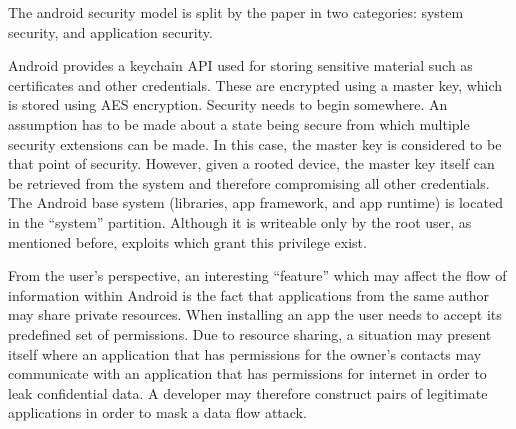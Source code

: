 The android security model is split by the paper in two categories: system security, and application security.

Android provides a keychain API used for storing sensitive material such as certificates and other credentials. These are encrypted using a master key, which is stored using AES encryption. Security needs to begin somewhere. An assumption has to be made about a state being secure from which multiple security extensions can be made. In this case, the master key is considered to be that point of security. However, given a rooted device, the master key itself can be retrieved from the system and therefore compromising all other credentials. The Android base system (libraries, app framework, and app runtime) is located in the ``system'' partition. Although it is writeable only by the root user, as mentioned before, exploits which grant this privilege exist. 

From the user's perspective, an interesting ``feature'' which may affect the flow of information within Android is the fact that applications from the same author may share private resources. When installing an app the user needs to accept its predefined set of permissions. Due to resource sharing, a situation may present itself where an application that has permissions for the owner's contacts may communicate with an application that has permissions for internet in order to leak confidential data. A developer may therefore construct pairs of legitimate applications in order to mask a data flow attack.

